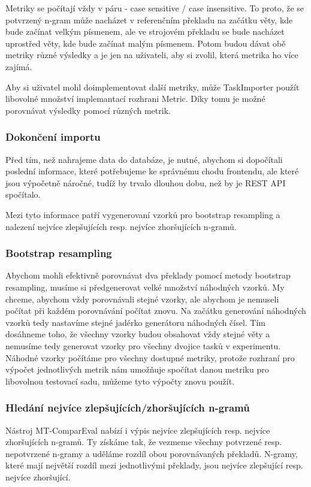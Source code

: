 Metriky se počítají vždy v páru - case sensitive / case insensitive.
To proto, že se potvrzený n-gram může nacházet v referenčním překladu na začátku věty,
  kde bude začínat velkým písmenem,
  ale ve strojovém překladu se bude nacházet uprostřed věty,
  kde bude začínat malým písmenem.
Potom budou dávat obě metriky různé výsledky 
  a je jen na uživateli,
  aby si zvolil, která metrika ho více zajímá.

Aby si uživatel mohl doimplementovat další metriky,
  může TaskImporter použít libovolné množství implemantací rozhrani Metric.
Díky tomu je možné porovnávat výsledky pomocí různých metrik.

\subsubsection{Dokončení importu}
Před tím, než nahrajeme data do databáze, je nutné,
  abychom si dopočítali poslední informace,
  které potřebujeme ke správnému chodu frontendu,
  ale které jsou výpočetně náročné,
  tudíž by trvalo dlouhou dobu,
  než by je REST API spočítalo.

Mezi tyto informace patří vygenerovaní vzorků pro bootstrap resampling a
  nalezení nejvíce zlepšujících resp. nejvíce zhoršujících n-gramů.

\subsubsection{Bootstrap resampling}
Abychom mohli efektivně porovnávat dva překlady pomocí metody bootstrap resampling,
  musíme si předgenerovat velké množství náhodných vzorků.
My chceme,
  abychom vždy porovnávali stejné vzorky,
  ale abychom je nemuseli počítat při každém porovnávání počítat znovu.
Na začátku generování náhodných vzorků tedy nastavíme stejné jadérko generátoru náhodných čísel.
Tím dosáhneme toho,
  že všechny vzorky budou obsahovat vždy stejné věty
  a nemusíme tedy generovat vzorky pro všechny dvojice tasků v experimentu.
Náhodné vzorky počítáme pro všechny dostupné metriky,
  protože rozhraní pro výpočet jednotlivých metrik nám umožňuje spočítat danou metriku pro libovolnou testovací sadu,
  můžeme tyto výpočty znovu použít.


\subsubsection{Hledání nejvíce zlepšujících/zhoršujících n-gramů}
Nástroj MT-ComparEval nabízí i výpis nejvíce zlepšujících resp. nejvíce zhoršujících n-gramů.
Ty získáme tak, že vezmeme všechny potvrzené resp. nepotvrzené n-gramy
  a uděláme rozdíl obou porovnávaných překladů.
N-gramy,
  které mají největší rozdíl mezi jednotlivými překlady,
  jsou nejvíce zlepšující resp. nejvíce zhoršující.

